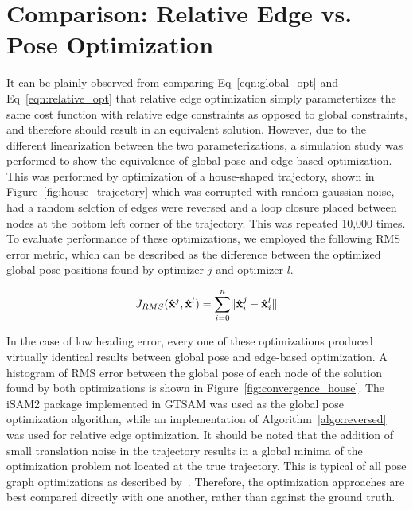 
\section{Comparison: Relative Edge vs. Pose Optimization}

It can be plainly observed from comparing Eq~\ref{eqn:global_opt} and Eq~\ref{eqn:relative_opt} that relative edge optimization simply parametertizes the same cost function with relative edge constraints as opposed to global constraints, and therefore should result in an equivalent solution.  However, due to the different linearization between the two parameterizations, a simulation study was performed to show the equivalence of global pose and edge-based optimization. This was performed by optimization of a house-shaped trajectory, shown in Figure~\ref{fig:house_trajectory} which was corrupted with random gaussian noise, had a random selction of edges were reversed and a loop closure placed between nodes at the bottom left corner of the trajectory. This was repeated 10,000 times.  To evaluate performance of these optimizations, we employed the following RMS error metric, which can be described as the difference between the optimized global pose positions found by optimizer $j$ and optimizer $l$.

\begin{align}
    J_{RMS}(\hat{\mathbf{x}}^j, \hat{\mathbf{x}}^l) = \sum_{i=0}^n \lVert \hat{\mathbf{x}}^j_i - \hat{\mathbf{x}}^l_i \rVert
\end{align}

In the case of low heading error, every one of these optimizations produced virtually identical results between global pose and edge-based optimization.  A histogram of RMS error between the global pose of each node of the solution found by both optimizations is shown in Figure~\ref{fig:convergence_house}.  The iSAM2 package implemented in GTSAM was used as the global pose optimization algorithm, while an implementation of Algorithm~\ref{algo:reversed} was used for relative edge optimization.  It should be noted that the addition of small translation noise in the trajectory results in a global minima of the optimization problem not located at the true trajectory.  This is typical of all pose graph optimizations as described by~\cite{POSE_GRAPH_ERROR}.  Therefore, the optimization approaches are best compared directly with one another, rather than against the ground truth.

